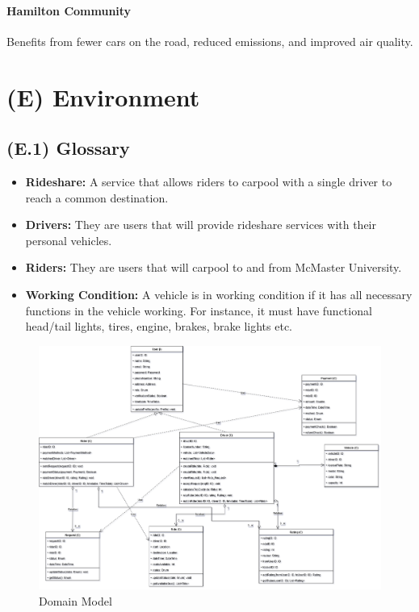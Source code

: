 \documentclass[12pt,letterpaper]{article}
\begin{document}
\paragraph{Hamilton Community}
Benefits from fewer cars on the road, reduced emissions, and improved air quality.

\clearpage

\section{(E) Environment}

\subsection{(E.1) Glossary}
\begin{itemize}
\item \textbf{Rideshare:} A service that allows riders to carpool with a single driver to reach a common destination.
\item \textbf{Drivers:} They are users that will provide rideshare services with their personal vehicles.  
\item \textbf{Riders:} They are users that will carpool to and from McMaster University.
\item \textbf{Working Condition:} A vehicle is in working condition if it has all necessary functions in the vehicle working. For instance, it must have functional head/tail lights, tires, engine, brakes, brake lights etc.
\end{itemize}

\begin{figure}[h] 
    \centering
    \includegraphics[width=0.8\linewidth]{Domain Model.png}
    \caption{Domain Model}
    \label{fig:domain-model}
\end{figure}
\end{document}
